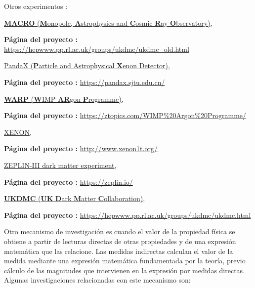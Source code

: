 Otros experimentos : 
\begin{itemize_f}
\item \href{https://en.wikipedia.org/wiki/Monopole,_Astrophysics_and_Cosmic_Ray_Observatory}{\textbf{MACRO} (\textbf{M}onopole, \textbf{A}strophysics and \textbf{C}osmic \textbf{R}ay \textbf{O}bservatory)}, 

\textbf{Página del proyecto :} \href{https://hepwww.pp.rl.ac.uk/groups/ukdmc/ukdmc_old.html}{https://hepwww.pp.rl.ac.uk/groups/ukdmc/ukdmc\_old.html}

\item \href{https://en.wikipedia.org/wiki/PandaX}{PandaX (\textbf{P}article and Astrophysical \textbf{X}enon Detector)}, 

\textbf{Página del proyecto :} \href{https://pandax.sjtu.edu.cn/}{https://pandax.sjtu.edu.cn/}

\item \href{https://en.wikipedia.org/wiki/WIMP_Argon_Programme}{\textbf{WARP} (\textbf{W}IMP \textbf{AR}gon \textbf{P}rogramme)}, 

\textbf{Página del proyecto :} \href{https://ztopics.com/WIMP\%20Argon\%20Programme/}{https://ztopics.com/WIMP\%20Argon\%20Programme/}

\item \href{https://en.wikipedia.org/wiki/XENON}{XENON}, 

\textbf{Página del proyecto :} \href{http://www.xenon1t.org/}{http://www.xenon1t.org/}

\item \href{https://en.wikipedia.org/wiki/ZEPLIN-III}{ZEPLIN-III dark matter experiment}, 

\textbf{Página del proyecto :} \href{https://zeplin.io/}{https://zeplin.io/}

\item \href{https://en.wikipedia.org/wiki/UK_Dark_Matter_Collaboration}{\textbf{UKDMC} (\textbf{UK} \textbf{D}ark \textbf{M}atter \textbf{C}ollaboration)}, 

\textbf{Página del proyecto :} \href{https://hepwww.pp.rl.ac.uk/groups/ukdmc/ukdmc.html}{https://hepwww.pp.rl.ac.uk/groups/ukdmc/ukdmc.html}
\end{itemize_f}
Otro mecanismo de investigación es cuando el valor de la propiedad física se obtiene a partir de lecturas directas de otras propiedades y de una expresión matemática que las relacione. Las medidas indirectas calculan el valor de la medida mediante una expresión matemática fundamentada por la teoría, previo cálculo de las magnitudes que intervienen en la expresión por medidas directas. Algunas investigaciones relacionadas con este mecanismo son: 

